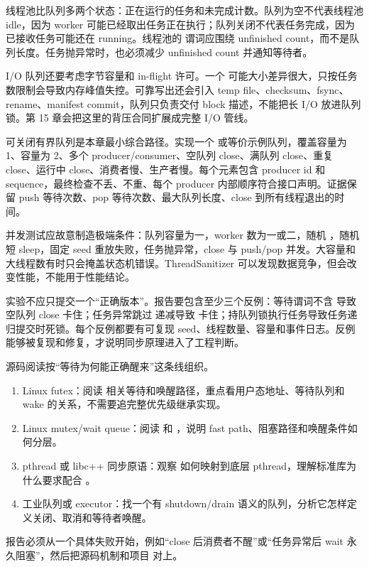 线程池比队列多两个状态：正在运行的任务和未完成计数。队列为空不代表线程池 idle，因为 worker 可能已经取出任务正在执行；队列关闭不代表任务完成，因为已接收任务可能还在 running。线程池的  谓词应围绕 unfinished count，而不是队列长度。任务抛异常时，也必须减少 unfinished count 并通知等待者。

I/O 队列还要考虑字节容量和 in-flight 许可。一个  可能大小差异很大，只按任务数限制会导致内存峰值失控。可靠写出还会引入 temp file、checksum、fsync、rename、manifest commit，队列只负责交付 block 描述，不能把长 I/O 放进队列锁。第 15 章会把这里的背压合同扩展成完整 I/O 管线。

可关闭有界队列是本章最小综合路径。实现一个  或等价示例队列，覆盖容量为 1、容量为 2、多个 producer/consumer、空队列 close、满队列 close、重复 close、运行中 close、消费者慢、生产者慢。每个元素包含 producer id 和 sequence，最终检查不丢、不重、每个 producer 内部顺序符合接口声明。证据保留 push 等待次数、pop 等待次数、最大队列长度、close 到所有线程退出的时间。

并发测试应故意制造极端条件：队列容量为一，worker 数为一或二，随机 ，随机短 sleep，固定 seed 重放失败，任务抛异常，close 与 push/pop 并发。大容量和大线程数有时只会掩盖状态机错误。ThreadSanitizer 可以发现数据竞争，但会改变性能，不能用于性能结论。

实验不应只提交一个“正确版本”。报告要包含至少三个反例：等待谓词不含  导致空队列 close 卡住；任务异常跳过  递减导致  卡住；持队列锁执行任务导致任务递归提交时死锁。每个反例都要有可复现 seed、线程数量、容量和事件日志。反例能够被复现和修复，才说明同步原理进入了工程判断。

\begin{sourcereadingbox}
源码阅读按“等待为何能正确醒来”这条线组织。
\begin{enumerate}
  \item Linux futex：阅读  相关等待和唤醒路径，重点看用户态地址、等待队列和 wake 的关系，不需要追完整优先级继承实现。
  \item Linux mutex/wait queue：阅读  和 ，说明 fast path、阻塞路径和唤醒条件如何分层。
  \item pthread 或 libc++ 同步原语：观察  如何映射到底层 pthread，理解标准库为什么要求配合 。
  \item 工业队列或 executor：找一个有 shutdown/drain 语义的队列，分析它怎样定义关闭、取消和等待者唤醒。
\end{enumerate}
报告必须从一个具体失败开始，例如“close 后消费者不醒”或“任务异常后 wait 永久阻塞”，然后把源码机制和项目  对上。
\end{sourcereadingbox}

